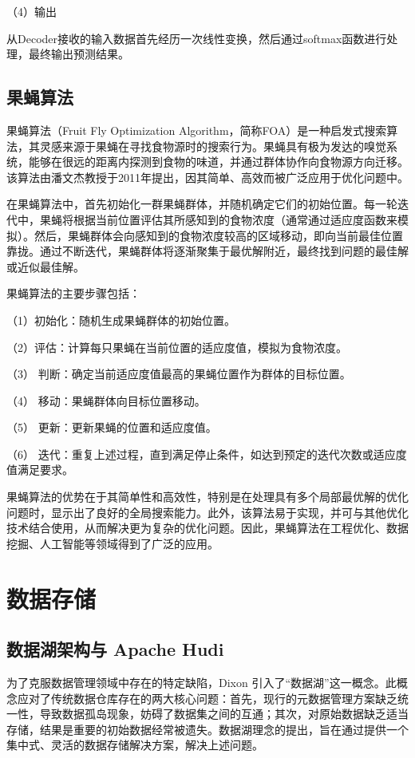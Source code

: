 （4）输出

从Decoder接收的输入数据首先经历一次线性变换，然后通过softmax函数进行处理，最终输出预测结果。

\subsection{果蝇算法}
果蝇算法（Fruit Fly Optimization Algorithm，简称FOA）是一种启发式搜索算法，其灵感来源于果蝇在寻找食物源时的搜索行为。果蝇具有极为发达的嗅觉系统，能够在很远的距离内探测到食物的味道，并通过群体协作向食物源方向迁移。该算法由潘文杰教授于2011年提出，因其简单、高效而被广泛应用于优化问题中。

在果蝇算法中，首先初始化一群果蝇群体，并随机确定它们的初始位置。每一轮迭代中，果蝇将根据当前位置评估其所感知到的食物浓度（通常通过适应度函数来模拟）。然后，果蝇群体会向感知到的食物浓度较高的区域移动，即向当前最佳位置靠拢。通过不断迭代，果蝇群体将逐渐聚集于最优解附近，最终找到问题的最佳解或近似最佳解。

果蝇算法的主要步骤包括：

（1）初始化：随机生成果蝇群体的初始位置。

（2）评估：计算每只果蝇在当前位置的适应度值，模拟为食物浓度。

（3） 判断：确定当前适应度值最高的果蝇位置作为群体的目标位置。

（4） 移动：果蝇群体向目标位置移动。

（5） 更新：更新果蝇的位置和适应度值。

（6） 迭代：重复上述过程，直到满足停止条件，如达到预定的迭代次数或适应度值满足要求。

果蝇算法的优势在于其简单性和高效性，特别是在处理具有多个局部最优解的优化问题时，显示出了良好的全局搜索能力。此外，该算法易于实现，并可与其他优化技术结合使用，从而解决更为复杂的优化问题。因此，果蝇算法在工程优化、数据挖掘、人工智能等领域得到了广泛的应用。
\section{数据存储}
\subsection{数据湖架构与 Apache Hudi}
为了克服数据管理领域中存在的特定缺陷，Dixon 引入了“数据湖”这一概念。此概念应对了传统数据仓库存在的两大核心问题：首先，现行的元数据管理方案缺乏统一性，导致数据孤岛现象，妨碍了数据集之间的互通；其次，对原始数据缺乏适当存储，结果是重要的初始数据经常被遗失。数据湖理念的提出，旨在通过提供一个集中式、灵活的数据存储解决方案，解决上述问题。

